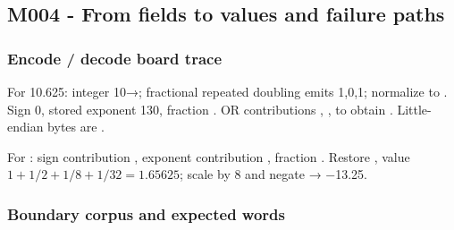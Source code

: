 \subsection{M004 - From fields to values and failure paths}\label{appendix-92ff77d4dfdc-m004---from-fields-to-values-and-failure-paths}

\hypertarget{appendix-92ff77d4dfdc-m004---from-fields-to-values-and-failure-paths}{}

\subsubsection{Encode / decode board trace}\label{appendix-92ff77d4dfdc-encode-decode-board-trace}

\hypertarget{appendix-92ff77d4dfdc-encode-decode-board-trace}{}

For 10.625: integer 10→; fractional repeated doubling emits 1,0,1; normalize  to . Sign 0, stored exponent 130, fraction . OR contributions , ,  to obtain . Little-endian bytes are .

For : sign contribution , exponent contribution , fraction . Restore , value \(1+1/2+1/8+1/32=1.65625\); scale by 8 and negate → −13.25.

\subsubsection{Boundary corpus and expected words}\label{appendix-92ff77d4dfdc-boundary-corpus-and-expected-words}

\hypertarget{appendix-92ff77d4dfdc-boundary-corpus-and-expected-words}{}

